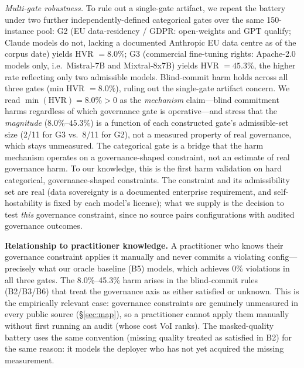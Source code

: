 \documentclass{article} %
\begin{document}
\emph{Multi-gate robustness.} To rule out a single-gate artifact, we repeat the battery under two further independently-defined categorical gates over the same 150-instance pool: G2 (EU data-residency / GDPR: open-weights and GPT qualify; Claude models do not, lacking a documented Anthropic EU data centre as of the corpus date) yields HVR $= \mathbf{8.0\%}$; G3 (commercial fine-tuning rights: Apache-2.0 models only, i.e.\ Mistral-7B and Mixtral-8x7B) yields HVR $= \mathbf{45.3\%}$, the higher rate reflecting only two admissible models. Blind-commit harm holds across all three gates (min HVR $= 8.0\%$), ruling out the single-gate artifact concern. We read $\min(\text{HVR}) = 8.0\% > 0$ as the \emph{mechanism} claim---blind commitment harms regardless of which governance gate is operative---and stress that the \emph{magnitude} ($8.0\%$--$45.3\%$) is a function of each constructed gate's admissible-set size (2/11 for G3 vs.\ 8/11 for G2), not a measured property of real governance, which stays unmeasured. The categorical gate is a bridge that the harm mechanism operates on a governance-shaped constraint, not an estimate of real governance harm. To our knowledge, this is the first harm validation on hard categorical, governance-shaped constraints. The constraint and its admissibility set are real (data sovereignty is a documented enterprise requirement, and self-hostability is fixed by each model's license); what we supply is the decision to test \emph{this} governance constraint, since no source pairs configurations with audited governance outcomes.

\textbf{Relationship to practitioner knowledge.} A practitioner who knows their governance constraint applies it manually and never commits a violating config---precisely what our oracle baseline (B5) models, which achieves 0\% violations in all three gates. The 8.0\%--45.3\% harm arises in the blind-commit rules (B2/B3/B6) that treat the governance axis as either satisfied or unknown. This is the empirically relevant case: governance constraints are genuinely unmeasured in every public source (§\ref{sec:map}), so a practitioner cannot apply them manually without first running an audit (whose cost VoI ranks). The masked-quality battery uses the same convention (missing quality treated as satisfied in B2) for the same reason: it models the deployer who has not yet acquired the missing measurement.
\end{document}
